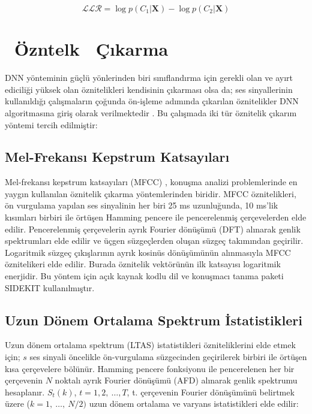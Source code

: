 \documentclass[conference, a4paper]{IEEEtran}
\begin{document}
\begin{equation}
    \mathcal{LLR}=\log p(C_1|\mathbf{X})-\log p(C_2|\mathbf{X})
\end{equation}

\section{{\ Ö}zn{}tel{}k {\ Ç}ıkarma}
DNN yönteminin güçlü yönlerinden biri sınıflandırma için gerekli olan ve ayırt ediciliği yüksek olan öznitelikleri
kendisinin çıkarması olsa da; ses sinyallerinin kullanıldığı çalışmaların çoğunda ön-işleme adımında çıkarılan
öznitelikler DNN algoritmasına giriş olarak verilmektedir \cite{nagarsheth2017replay}. Bu çalışmada iki tür öznitelik
çıkarım yöntemi tercih edilmiştir:

\subsection{Mel-Frekansı Kepstrum Katsayıları}
Mel-frekansı kepstrum katsayıları (MFCC) \cite{kinnunen2010overview,davis1980comparison}, konuşma analizi
problemlerinde en yaygın kullanılan öznitelik çıkarma yöntemlerinden biridir. MFCC öznitelikleri, ön vurgulama yapılan
ses sinyalinin her biri 25 ms uzunluğunda, 10 ms'lik kısımları birbiri ile örtüşen Hamming pencere ile pencerelenmiş
çerçevelerden elde edilir. Pencerelenmiş çerçevelerin ayrık Fourier dönüşümü (DFT) alınarak genlik spektrumları elde
edilir ve üçgen süzgeçlerden oluşan süzgeç takımından geçirilir. Logaritmik süzgeç çıkışlarının ayrık kosinüs
dönüşümünün alınmasıyla MFCC öznitelikeri elde edilir. Burada öznitelik vektörünün ilk katsayısı logaritmik enerjidir.
Bu yöntem için açık kaynak kodlu dil ve konuşmacı tanıma paketi SIDEKIT \cite{sidekit} kullanılmıştır.

\subsection{Uzun Dönem Ortalama Spektrum İstatistikleri}
Uzun dönem ortalama spektrum (LTAS) istatistikleri \cite{muckenhirn2016presentation}  özniteliklerini elde etmek için;
$s$ ses sinyali öncelikle ön-vurgulama süzgecinden geçirilerek birbiri ile örtüşen kısa çerçevelere bölünür. Hamming
pencere fonksiyonu ile pencerelenen her bir çerçevenin $N$ noktalı ayrık Fourier dönüşümü (AFD) alınarak genlik
spektrumu hesaplanır. $S_t(k)$, $t=1,2,\:\ldots,T$, t. çerçevenin Fourier dönüşümünü belirtmek üzere
($k=1,\:\ldots,\:N/2)$ uzun dönem ortalama ve varyans istatistikleri elde edilir:
\end{document}
